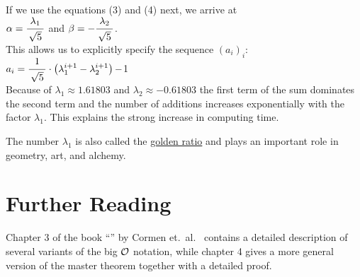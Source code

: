 If we use the equations (3) and (4) next, we arrive at \\[0.2cm]
\hspace*{1.3cm} 
$\alpha = \bruch{\lambda_1}{\sqrt{5}} $ \quad and \quad $\beta = -\bruch{\lambda_2}{\sqrt{5}}$. \\[0.2cm]
This allows us to explicitly specify the sequence $(a_i)_i$: \\[0.2cm]
\hspace*{1.3cm} 
$\displaystyle 
   a_i = \bruch{1}{\sqrt{5}} \cdot \left( \lambda_1^{i+1} - \lambda_2^{i+1} \right) - $1 \\[0.2cm]
Because of $\lambda_1\approx 1.61803$ and $\lambda_2 \approx - 0.61803$ the first term
of the sum dominates the second term and the number of additions increases exponentially with the factor $\lambda_1$.
This explains the strong increase in computing time.
\vspace*{0.3cm}

\remark 
The number $\lambda_1$ is also called the \href{https://en.wikipedia.org/wiki/Golden_ratio}{golden ratio} 
and plays an important role in geometry, art, and alchemy.

\section{Further Reading}
Chapter 3 of the book ``'' by Cormen et.~al.~\cite{cormen:09}
contains a detailed description of several variants of the big $\mathcal{O}$ notation, while
chapter 4 gives a more general version of the master theorem together with a detailed proof.


